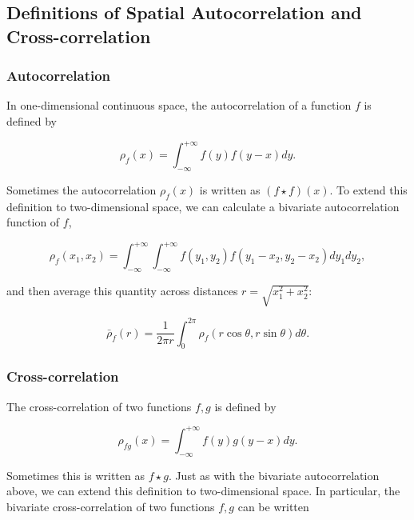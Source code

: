 \documentclass{article}
\begin{document}
\hypertarget{definitions-of-spatial-autocorrelation-and-cross-correlation}{%
\subsection{Definitions of Spatial Autocorrelation and
Cross-correlation}\label{definitions-of-spatial-autocorrelation-and-cross-correlation}}

\hypertarget{autocorrelation}{%
\subsubsection{Autocorrelation}\label{autocorrelation}}

In one-dimensional continuous space, the autocorrelation of a function
\(f\) is defined by

\begin{equation}
  \rho_f(x)=\int_{-\infty}^{+\infty}f(y)f(y-x)dy.
\end{equation}

Sometimes the autocorrelation \(\rho_f(x)\) is written as
\((f\star f)(x)\). To extend this definition to two-dimensional space,
we can calculate a bivariate autocorrelation function of \(f\),

\begin{equation}
  \rho_f(x_1,x_2)=\int_{-\infty}^{+\infty}\int_{-\infty}^{+\infty}f(y_1,y_2)f(y_1-x_2,y_2-x_2)dy_1dy_2,
\end{equation}

and then average this quantity across distances
\(r=\sqrt{x_1^2+x_2^2}\):

\begin{equation}
  \bar\rho_f(r)=\frac{1}{2\pi r}\int_0^{2\pi}\rho_f(r\cos\theta,r\sin\theta)d\theta.
\end{equation}

\hypertarget{cross-correlation}{%
\subsubsection{Cross-correlation}\label{cross-correlation}}

The cross-correlation of two functions \(f,g\) is defined by

\begin{equation}
  \rho_{fg}(x)=\int_{-\infty}^{+\infty}f(y)g(y-x)dy.
\end{equation}

Sometimes this is written as \(f\star g\). Just as with the bivariate
autocorrelation above, we can extend this definition to two-dimensional
space. In particular, the bivariate cross-correlation of two functions
\(f,g\) can be written
\end{document}
